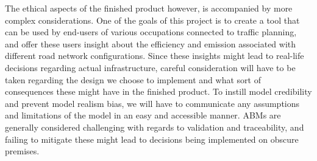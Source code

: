     The ethical aspects of the finished product however, is accompanied by more complex considerations. One of the goals of this project is to create a tool that can be used by end-users of various occupations connected to traffic planning, and offer these users insight about the efficiency and emission associated with different road network configurations. Since these insights might lead to real-life decisions regarding actual infrastructure, careful consideration will have to be taken regarding the design we choose to implement and what sort of consequences these might have in the finished product. To instill model credibility and prevent model realism bias, we will have to communicate any assumptions and limitations of the model in an easy and accessible manner. ABMs are generally considered challenging with regards to validation and traceability\cite{abm-validation-issues}, and failing to mitigate these might lead to decisions being implemented on obscure premises. 
